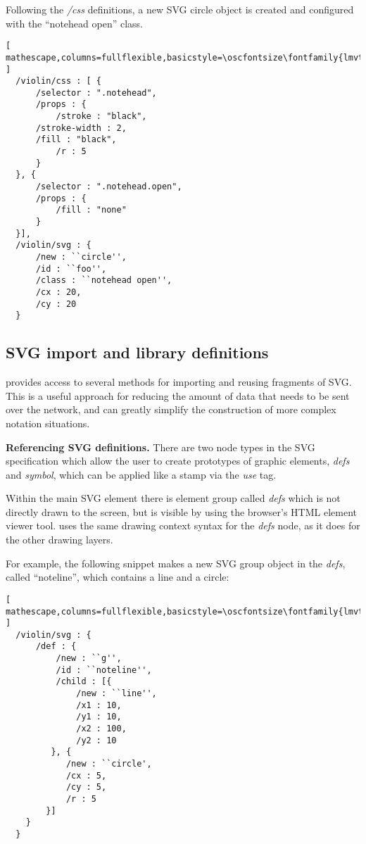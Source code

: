 Following the \textit{/css} definitions, a new SVG circle object is created and configured with the ``notehead open'' class.

\begin{lstlisting}[ mathescape,columns=fullflexible,basicstyle=\oscfontsize\fontfamily{lmvtt}\selectfont ]
  /violin/css : [ {
      /selector : ".notehead",
      /props : {
          /stroke : "black",
	  /stroke-width : 2,
	  /fill : "black",
          /r : 5
      }
  }, {
      /selector : ".notehead.open",
      /props : {
          /fill : "none"
      }
  }],
  /violin/svg : {
      /new : ``circle'',
      /id : ``foo'',
      /class : ``notehead open'',
      /cx : 20,
      /cy : 20
  }
 \end{lstlisting}


\subsection{SVG import and library definitions}\label{sec:defs}
\drawsocket provides access to several methods for importing and reusing fragments of SVG.
This is a useful approach for reducing the amount of data that needs to be sent over the network, and can greatly simplify the construction of more complex notation situations.

\medskip
\noindent
\textbf{Referencing SVG definitions.} 
There are two node types in the SVG specification which allow the user to create prototypes of graphic elements, \textit{defs} and \textit{symbol}, which can be applied like a stamp via the \textit{use} tag. 

Within the \drawsocket main SVG element there is element group called \textit{defs} which is not directly drawn to the screen, but is visible by using the browser's HTML element viewer tool.
\drawsocket uses the same drawing context syntax for the \textit{defs} node, as it does for the other drawing layers.

For example, the following snippet makes a new SVG group object in the \textit{defs}, called ``noteline'', which contains a line and a circle:

\begin{lstlisting}[ mathescape,columns=fullflexible,basicstyle=\oscfontsize\fontfamily{lmvtt}\selectfont ]
  /violin/svg : {
      /def : {
          /new : ``g'',
          /id : ``noteline'',
          /child : [{
              /new : ``line'',
              /x1 : 10,
              /y1 : 10,
              /x2 : 100,
              /y2 : 10
         }, {
            /new : ``circle',
            /cx : 5,
            /cy : 5,
            /r : 5
        }]
    } 
  }
 \end{lstlisting}

